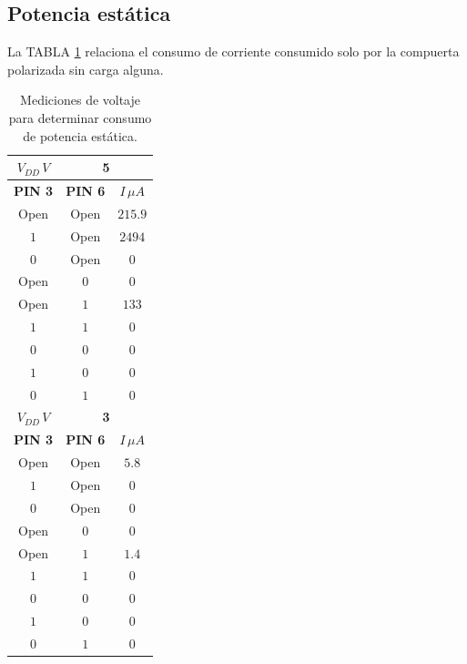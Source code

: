 \documentclass[twocolumn]{IEEEtran}
\begin{document}
\subsection{Potencia estática}
\noindent
La TABLA \ref{tab4} relaciona el consumo de corriente consumido solo por la compuerta polarizada sin carga alguna.
\begin{table}[H]
  \centering
    \caption{Mediciones de voltaje para determinar consumo de potencia estática.}
      \begin{tabular}{|c|c|c|}\hline
      $V_{DD}\, V$ & \multicolumn{2}{c|}{\textbf{5}}\\ \hline
      \textbf{PIN 3} & \textbf{PIN 6} & $I\, \mu A$ \\ \hline
      Open & Open & $215.9$ \\ \hline
      $1$ & Open & $2494$ \\ \hline
      $0$ & Open & $0$ \\ \hline
      Open & $0$ & $0$ \\ \hline
      Open & $1$ & $133$ \\ \hline
      $1$ & $1$ & $0$ \\ \hline
      $0$ & $0$ & $0$ \\ \hline
      $1$ & $0$ & $0$ \\ \hline
      $0$ & $1$ & $0$ \\ \hline
      $V_{DD}\, V$ & \multicolumn{2}{c|}{\textbf{3}} \\ \hline
      \textbf{PIN 3} & \textbf{PIN 6} & $I\, \mu A$ \\ \hline
      Open & Open & $5.8$ \\ \hline
      $1$ & Open & $0$ \\ \hline
      $0$ & Open & $0$ \\ \hline
      Open & $0$ & $0$ \\ \hline
      Open & $1$ & $1.4$ \\ \hline
      $1$ & $1$ & $0$ \\ \hline
      $0$ & $0$ & $0$ \\ \hline
      $1$ & $0$ & $0$ \\ \hline
      $0$ & $1$ & $0$ \\ \hline
      \end{tabular}
   \label{tab4}
\end{table}
\end{document}
